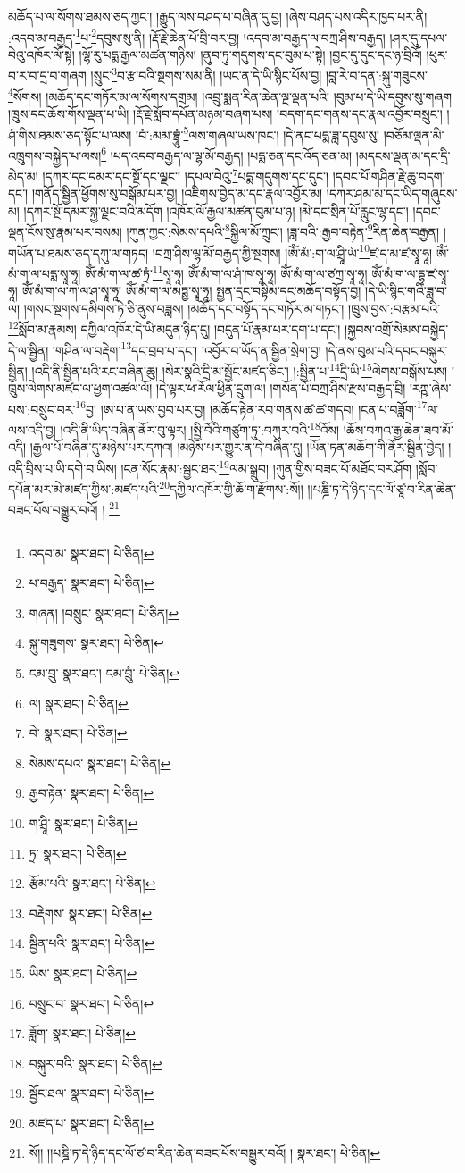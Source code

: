 མཆོད་པ་ལ་སོགས་ཐམས་ཅད་ཀྱང་། །རྒྱུད་ལས་བཤད་པ་བཞིན་དུ་བྱ། །ཞེས་བཤད་པས་འདིར་ཁྱད་པར་ནི། :འདབ་མ་བརྒྱད་\footnote{འདབ་མ་  སྣར་ཐང་།  པེ་ཅིན། }པ་\footnote{པ་བརྒྱད་  སྣར་ཐང་།  པེ་ཅིན། }དབུས་སུ་ནི། །རྡོ་རྗེ་ཆེན་པོ་བྲི་བར་བྱ། །འདབ་མ་བརྒྱད་ལ་བཀྲ་ཤིས་བརྒྱད། །ཤར་དུ་དཔལ་བེའུ་འཁོར་ལོ་སྟེ། །ལྷོ་རུ་པདྨ་རྒྱལ་མཚན་གཉིས། །ནུབ་ཏུ་གདུགས་དང་བུམ་པ་སྟེ། །བྱང་དུ་དུང་དང་ཉ་བྲིའོ། །ཕུར་བ་ར་བ་དྲ་བ་གཞག །སྲུང་\footnote{གཞན། །བསྲུང་  སྣར་ཐང་།  པེ་ཅིན། }བ་རྩ་བའི་སྔགས་སམ་ནི། །ཡང་ན་དེ་ཡི་སྙིང་པོས་བྱ། །བླ་རེ་བ་དན་:སྐུ་གཟུངས་\footnote{སྐུ་གཟུགས་  སྣར་ཐང་།  པེ་ཅིན། }སོགས། །མཆོད་དང་གཏོར་མ་ལ་སོགས་དགྲམ། །འབྲུ་སྨན་རིན་ཆེན་ལྔ་ལྡན་པའི། །བུམ་པ་དེ་ཡི་དབུས་སུ་གཞག །ཁྲུས་དང་ཆོས་གོས་ལྡན་པ་ཡི། །རྡོ་རྗེ་སློབ་དཔོན་མཉམ་བཞག་པས། །བདག་དང་གནས་དང་རྣལ་འབྱོར་བསྲུང་། །ཤཾ་གིས་ཐམས་ཅད་སྟོང་པ་ལས། །བཾ་:མམ་བྷྲཱུཾ་\footnote{ངམ་བྲུ་  སྣར་ཐང་། ངམ་བྲུཾ་  པེ་ཅིན། }ལས་གཞལ་ཡས་ཁང་། །དེ་ནང་པདྨ་ཟླ་དབུས་སུ། །བཅོམ་ལྡན་མི་འཁྲུགས་བསྐྱེད་པ་ལས།\footnote{ལ།  སྣར་ཐང་།  པེ་ཅིན། } །པད་འདབ་བརྒྱད་ལ་ལྷ་མོ་བརྒྱད། །པདྨ་ཅན་དང་འོད་ཅན་མ། །མདངས་ལྡན་མ་དང་དྲི་མེད་མ། །དཀར་དང་དམར་དང་སྔོ་དང་ལྗང་། །དཔལ་བེའུ་\footnote{བེ་  སྣར་ཐང་།  པེ་ཅིན། }པདྨ་གདུགས་དང་དུང་། །དབང་པོ་གཤིན་རྗེ་ཆུ་བདག་དང་། །གནོད་སྦྱིན་ཕྱོགས་སུ་བསྒོམ་པར་བྱ། །འཇིགས་བྱེད་མ་དང་རྣལ་འབྱོར་མ། །དཀར་ཤམ་མ་དང་ཡིད་གཞུངས་མ། །དཀར་སྔོ་དམར་སྐྱ་ལྗང་བའི་མདོག །འཁོར་ལོ་རྒྱལ་མཚན་བུམ་པ་ཉ། །མེ་དང་སྲིན་པོ་རླུང་ལྷ་དང་། །དབང་ལྡན་ངོས་སུ་རྣམ་པར་བསམ། །ཀུན་ཀྱང་:སེམས་དཔའི་\footnote{སེམས་དཔའ་  སྣར་ཐང་།  པེ་ཅིན། }སྐྱིལ་མོ་ཀྲུང་། །ཟླ་བའི་:རྒྱབ་བརྟེན་\footnote{རྒྱབ་རྟེན་  སྣར་ཐང་།  པེ་ཅིན། }རིན་ཆེན་བརྒྱན། །གཡོན་པ་ཐམས་ཅད་དཀུ་ལ་གཏད། །བཀྲ་ཤིས་ལྷ་མོ་བརྒྱད་ཀྱི་སྔགས། །ཨོཾ་མཾ་:ག་ལ་ཤྲཱི་ཡཾ་\footnote{ག་ཤྲཱི་  སྣར་ཐང་།  པེ་ཅིན། }ཛ་ད་མ་ཛ་སྭཱ་ཧཱ། ཨོཾ་མཾ་ག་ལ་པདྨ་སྭཱ་ཧཱ། ཨོཾ་མཾ་ག་ལ་ཚ་ཏྲཾ་\footnote{ཏྲ་  སྣར་ཐང་།  པེ་ཅིན། }སྭཱ་ཧཱ། ཨོཾ་མཾ་ག་ལ་ཤཾ་ཁ་སྭཱ་ཧཱ། ཨོཾ་མཾ་ག་ལ་ཙཀྲ་སྭཱ་ཧཱ། ཨོཾ་མཾ་ག་ལ་དྷྭ་ཛ་སྭཱ་ཧཱ། ཨོཾ་མཾ་ག་ལ་ཀ་ལ་ཤ་སྭཱ་ཧཱ། ཨོཾ་མཾ་ག་ལ་མཏྶྱ་སྭཱ་ཧཱ། སྤྱན་དྲང་བསྟིམ་དང་མཆོད་བསྟོད་བྱ། །དེ་ཡི་སྙིང་གའི་ཟླ་བ་ལ། །གསང་སྔགས་དམིགས་ཏེ་ཅི་ནུས་བཟླས། །མཆོད་དང་བསྟོད་དང་གཏོར་མ་གཏང་། །ཁྲུས་བྱས་:བརྩམ་པའི་\footnote{རྩོམ་པའི་  སྣར་ཐང་།  པེ་ཅིན། }སློབ་མ་རྣམས། དཀྱིལ་འཁོར་དེ་ཡི་མདུན་ཉིད་དུ། །བདུན་པོ་རྣམ་པར་དག་པ་དང་། །སྐྱབས་འགྲོ་སེམས་བསྐྱེད་དེ་ལ་སྦྱིན། །གཤིན་ལ་བརྡེག་\footnote{བརྡེགས་  སྣར་ཐང་།  པེ་ཅིན། }དང་བྲབ་པ་དང་། །འབྱོར་བ་ཡོད་ན་སྦྱིན་སྲེག་བྱ། །དེ་ནས་བུམ་པའི་དབང་བསྐུར་སྦྱིན། །འདི་ནི་སྦྱིན་པའི་རང་བཞིན་ཆུ། །སེར་སྣའི་དྲི་མ་སྦྱོང་མཛད་ཅིང་། །:སྦྱིན་པ་\footnote{སྦྱིན་པའི་  སྣར་ཐང་།  པེ་ཅིན། }དྲི་ཡི་\footnote{ཡིས་  སྣར་ཐང་།  པེ་ཅིན། }ལེགས་བསྒོས་པས། །
ཁྲུས་ལེགས་མཛད་ལ་ཕྱག་འཚལ་ལོ། །དེ་ལྟར་ཕ་རོལ་ཕྱིན་དྲུག་ལ། །གསོན་པོ་བཀྲ་ཤིས་རྫས་བརྒྱད་བྲི། །རཀྵ་ཞེས་པས་:བསྲུང་བར་\footnote{བསྲུང་བ་  སྣར་ཐང་།  པེ་ཅིན། }བྱ། །ཨ་པ་ན་ཡས་བྱབ་པར་བྱ། །མཆོད་རྟེན་རབ་གནས་ཚ་ཚ་གདབ། །ངན་པ་བཟློག་\footnote{ཟློག་  སྣར་ཐང་།  པེ་ཅིན། }ལ་ལས་འདི་བྱ། །འདི་ནི་ཡིད་བཞིན་ནོར་བུ་ལྟར། །སྤྱི་བོའི་གཙུག་ཏུ་:བཀུར་བའི་\footnote{བསྐུར་བའི་  སྣར་ཐང་།  པེ་ཅིན། }འོས། །ཆོས་བཀའ་རྒྱ་ཆེན་ཟབ་མོ་འདི། །རྒྱལ་པོ་བཞིན་དུ་མཉེས་པར་དཀའ། །མཉེས་པར་གྱུར་ན་དེ་བཞིན་དུ། །ཡོན་ཏན་མཆོག་གི་ནོར་སྦྱིན་བྱེད། །འདི་བྲིས་པ་ཡི་དགེ་བ་ཡིས། །ངན་སོང་རྣམ་:སྦྱང་ཐར་\footnote{སྦྱོང་ཐལ་  སྣར་ཐང་།  པེ་ཅིན། }ལམ་སྒྲུབ། །ཀུན་གྱིས་བཟང་པོ་མཐོང་བར་ཤོག །སློབ་དཔོན་མར་མེ་མཛད་ཀྱིས་:མཛད་པའི་\footnote{མཛད་པ་  སྣར་ཐང་།  པེ་ཅིན། }དཀྱིལ་འཁོར་གྱི་ཆོ་ག་རྫོགས་:སོ།། །།པཎྜི་ཏ་དེ་ཉིད་དང་ལོ་ཙཱ་བ་རིན་ཆེན་བཟང་པོས་བསྒྱུར་བའོ། ། \footnote{སོ།། །།པཎྜི་ཏ་དེ་ཉིད་དང་ལོ་ཙ་བ་རིན་ཆེན་བཟང་པོས་བསྒྱུར་བའོ། །   སྣར་ཐང་།  པེ་ཅིན། }